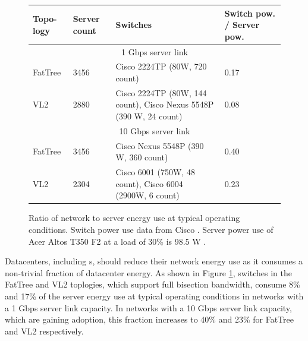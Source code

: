 \begin{figure}[t]
\centering
\begin{small}
\begin{tabular}{| m{0.9cm} | m{0.7cm} | m{3cm} | m{1.8cm} |}
\hline
Topo-logy & Server count & Switches & Switch pow. / Server pow. \\ \hline
\multicolumn{4}{|c|}{1 Gbps server link}                                                  \\\hline
FatTree  & 3456        & Cisco 2224TP (80W, 720 count) & 0.17                                      \\\hline
VL2        & 2880        & Cisco  2224TP (80W, 144 count), Cisco Nexus 5548P (390 W, 24 count)                               & 0.08                                      \\ \hline
\multicolumn{4}{|c|}{10 Gbps server link}                                                  \\\hline
FatTree  & 3456        & Cisco Nexus 5548P (390 W, 360 count) & 0.40                                      \\\hline
VL2        & 2304        & Cisco 6001 (750W, 48 count), Cisco 6004 (2900W, 6 count) & 0.23                                      \\ \hline
\end{tabular}
\end{small}
\caption{Ratio of network to server energy use at typical operating conditions. Switch power use data from Cisco \cite{cisco-dc-switches}. Server power use  of Acer Altos T350 F2 at a load of 30\% is 98.5 W \cite{spec}.}
\label{fig:network-power-use}
\end{figure}


Datacenters, including \cdc s, should reduce their network energy use as it consumes a non-trivial fraction of datacenter energy. As shown in Figure \ref{fig:network-power-use},  switches in the FatTree \cite{fattree} and VL2 \cite{vl2} toplogies, which support full bisection bandwidth, consume 8\% and 17\% of the server energy use  at typical operating conditions in networks with a 1 Gbps server link capacity. In networks with a 10 Gbps server link capacity, which are gaining adoption, this fraction increases to 40\% and 23\% for FatTree and VL2 respectively. 


